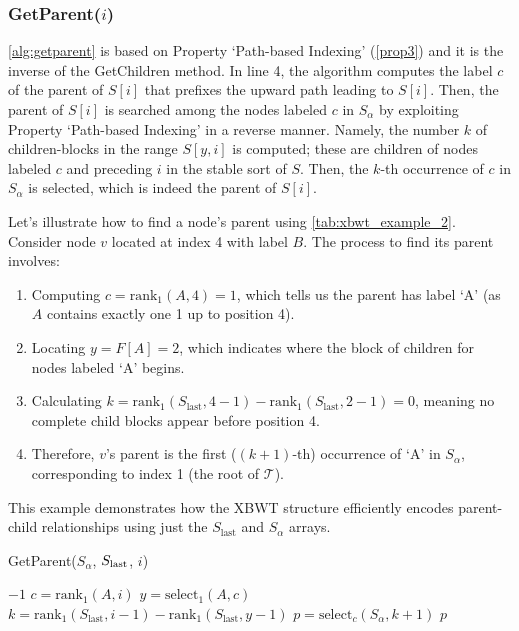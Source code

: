 \subsubsection*{GetParent($i$)}
\cref{alg:getparent} is based on Property `Path-based Indexing' (\cref{prop3}) and it is the inverse of the GetChildren method. In line 4, the algorithm computes the label $c$ of the parent of $S[i]$ that prefixes the upward path leading to $S[i]$. Then, the parent of $S[i]$ is searched among the nodes labeled $c$ in $S_{\alpha}$ by exploiting Property `Path-based Indexing' in a reverse manner. Namely, the number $k$ of children-blocks in the range $S[y, i]$ is computed; these are children of nodes labeled $c$ and preceding $i$ in the stable sort of $S$. Then, the $k$-th occurrence of $c$ in $S_{\alpha}$ is selected, which is indeed the parent of $S[i]$.

\begin{example}
    Let's illustrate how to find a node's parent using \cref{tab:xbwt_example_2}. Consider node $v$ located at index 4 with label $B$. The process to find its parent involves:
    \begin{enumerate}
        \item Computing $c = \text{rank}_1(A, 4) = 1$, which tells us the parent has label `A' (as $A$ contains exactly one 1 up to position 4).
        \item Locating $y = F[A] = 2$, which indicates where the block of children for nodes labeled `A' begins.
        \item Calculating $k = \text{rank}_1(S_{\text{last}}, 4-1) - \text{rank}_1(S_{\text{last}}, 2-1) = 0$, meaning no complete child blocks appear before position 4.
        \item Therefore, $v$'s parent is the first ($(k+1)$-th) occurrence of `A' in $S_{\alpha}$, corresponding to index 1 (the root of $\mathcal{T}$).
    \end{enumerate}
    This example demonstrates how the XBWT structure efficiently encodes parent-child relationships using just the $S_{\text{last}}$ and $S_{\alpha}$ arrays.
\end{example}

\begin{algorithm}[H]
    \caption{GetParent($S_\alpha$, $S_{\textup{last}}$, $i$)}
    \label{alg:getparent}
    \begin{algorithmic}[1]
        \State \Return $-1$ 
    \EndIf
    \State $c = \text{rank}_1(A, i)$
    \State $y = \text{select}_1(A, c)$
    \State $k = \text{rank}_1(S_{\text{last}}, i - 1) - \text{rank}_1(S_{\text{last}}, y - 1)$
    \State $p = \text{select}_c(S_\alpha, k + 1)$
    \State \Return $p$
    \end{algorithmic}
\end{algorithm}

